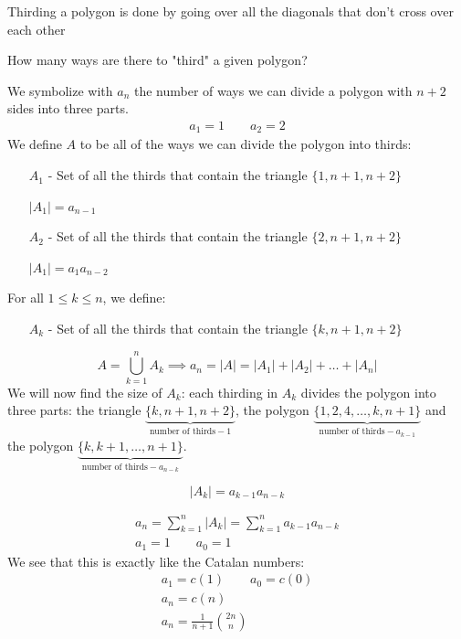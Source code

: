 \documentclass[00_complete]{subfiles}
\begin{document}
\begin{example}
Thirding a polygon is done by going over all the diagonals that don't
cross over each other

How many ways are there to "third" a given polygon?

We symbolize with $a_n$ the number of ways we can divide a polygon with
$n+2$ sides into three parts.
$$
\begin{gathered}
    a_1=1 \qquad a_2=2
\end{gathered}
$$
We define $A$ to be all of the ways we can divide the polygon into thirds:

\begin{itemize}
    \item[$A_1$ -] Set of all the thirds that contain the triangle
        $\{1,n+1,n+2\}$

    $|A_1|=a_{n-1}$
    \item[$A_2$ -] Set of all the thirds that contain the triangle
        $\{2,n+1,n+2\}$

    $|A_1|=a_{1}a_{n-2}$
\end{itemize}
For all $1 \leq k \leq n$, we define:
\begin{itemize}
    \item[$A_k$ -] Set of all the thirds that contain the triangle
        $\{k,n+1,n+2\}$
\end{itemize}
$$A=\bigcup_{k=1}^n A_k \implies a_n =|A|=|A_1|+|A_2|+\dots+|A_n|$$
We will now find the size of $A_k$: each thirding in $A_k$ divides the
polygon into three parts: the triangle
$\underbrace{\{k,n+1,n+2\}}_{\text{number of thirds}-1}$, the polygon
$\underbrace{\{1,2,4,\dots,k,n+1\}}_{\text{number of thirds}-a_{k-1}}$ and the
polygon $\underbrace{\{k,k+1,\dots,n+1\}}_{\text{number of thirds}-a_{n-k}}$.

$$|A_k|=a_{k-1}a_{n-k}$$
\begin{conclusion}
    $$
    \begin{gathered}
        a_n=\sum_{k=1}^{n}|A_k|=\sum_{k=1}^{n}a_{k-1}a_{n-k} \\
        a_1 = 1 \qquad a_0 = 1
    \end{gathered}
    $$
    We see that this is exactly like the Catalan numbers:
    $$
    \begin{gathered}
        a_1=c(1) \qquad a_0=c(0) \\
        a_n=c(n) \\
        \boxed{a_n=\frac{1}{n+1}\binom{2n}{n}}
    \end{gathered}
    $$
\end{conclusion}
\end{example}
\end{document}
